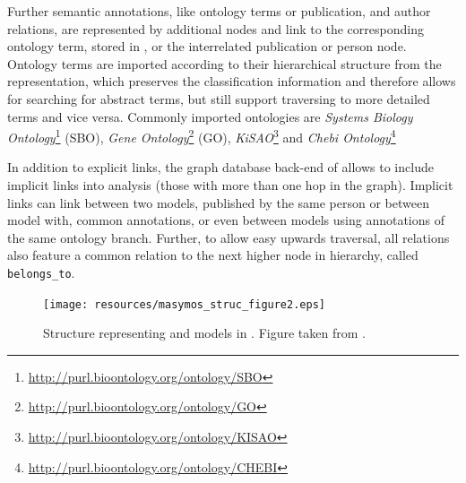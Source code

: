 Further semantic annotations, like ontology terms or publication, and author relations, are represented by additional nodes and link to the corresponding ontology term, stored in \neoj, or the interrelated publication or person node. 
Ontology terms are imported according to their hierarchical structure from the \owl representation, which preserves the classification information and therefore allows for searching for abstract terms, but still support traversing to more detailed terms and vice versa.
Commonly imported ontologies are \emph{Systems Biology Ontology}\footnote{\url{http://purl.bioontology.org/ontology/SBO}} (SBO), \emph{Gene Ontology}\footnote{\url{http://purl.bioontology.org/ontology/GO}} (GO), \emph{KiSAO}\footnote{\url{http://purl.bioontology.org/ontology/KISAO}} and \emph{Chebi Ontology}\footnote{\url{http://purl.bioontology.org/ontology/CHEBI}}

In addition to explicit links, the graph database back-end of \masymos allows to include implicit links into analysis (those with more than one hop in the graph). Implicit links can link between two models, published by the same person or between model with, common annotations, or even between models using annotations of the same ontology branch.
Further, to allow easy upwards traversal, all relations also feature a common relation to the next higher node in hierarchy, called \texttt{belongs\_to}.

\begin{figure}[h]
	\centering
	\texttt{[image: resources/masymos\_struc\_figure2.eps]}
	\caption{Structure representing \sbml and \cellml models in \masymos. Figure taken from \citealt{Henkel2015}.}
	\label{fig:background:graph-db:masymos}
\end{figure}

